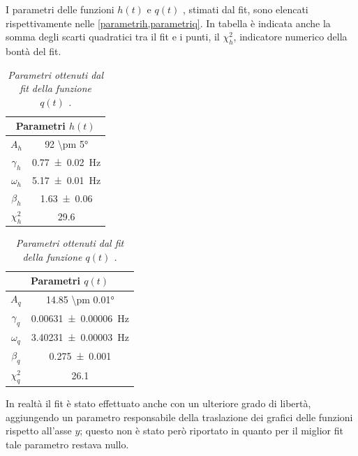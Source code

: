\documentclass[11pt, a4paper, twoside, italian]{article}
\begin{document}
I parametri delle funzioni $h(t)$  e $q(t)$ , stimati dal fit, sono elencati rispettivamente 
nelle \cref{parametrih,parametriq}.
In tabella è indicata anche la somma degli scarti quadratici tra il fit e i punti, il
$\chi^2_h$, indicatore numerico della bontà del fit.
\begin{table}[h!]
  \centering
\begin{minipage}{0.45\linewidth}
  \centering
  \begin{tabular}{cc}
      \toprule
      \multicolumn{2}{c}{Parametri $h(t)$} \\ 
      \midrule
      $A_h$     & \ang{92 \pm 5} \\
      $\gamma_h$& \SI{0.77 \pm 0.02}{\hertz} \\
      $\omega_h$& \SI{5.17 \pm 0.01}{\hertz}\\
      $\beta_h$   &  \SI{1.63 \pm 0.06}{}  \\
      $\chi^2_h$   &  \SI{29.6}{}  \\
      \midrule
    \end{tabular}
  \caption{\textit{Parametri ottenuti dal fit della funzione $h(t)$ .}}
  \label{parametrih}
\end{minipage}
\begin{minipage}{0.45\linewidth}
  \centering
    \begin{tabular}{cc}
        \toprule
        \multicolumn{2}{c}{Parametri $q(t)$} \\ 
        \midrule
        $A_q$     & \ang{14.85 \pm 0.01} \\
        $\gamma_q$& \SI{0.00631 \pm 0.00006}{\hertz} \\
        $\omega_q$& \SI{3.40231 \pm 0.00003}{\hertz}\\
        $\beta_q$   &  \SI{0.275 \pm 0.001}{}  \\
        $\chi^2_q$   &  \SI{26.1}{}  \\
        \midrule
      \end{tabular}
    \caption{\textit{Parametri ottenuti dal fit della funzione $q(t)$ .}}
    \label{parametriq}
\end{minipage}
\end{table}
In realtà il fit è stato effettuato anche con un ulteriore grado di libertà, aggiungendo
un parametro responsabile della traslazione dei grafici delle funzioni rispetto 
all'asse $y$; questo non è stato però riportato in quanto per il miglior fit
tale parametro restava nullo.
\end{document}
